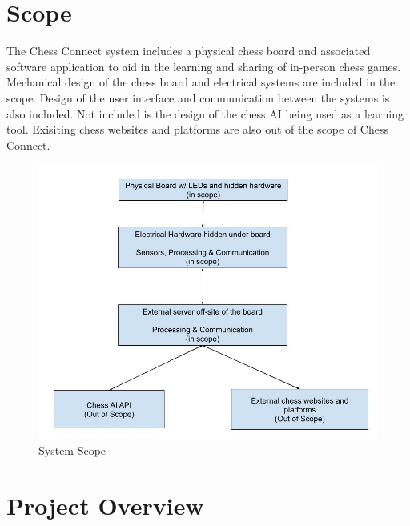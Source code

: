 \documentclass[12pt, titlepage]{article}
\begin{document}
\section{Scope}
The Chess Connect system includes a physical chess board and associated software 
application to aid in the learning and sharing of in-person chess games. 
Mechanical design of the chess board and electrical systems are included in the 
scope. Design of the user interface and communication between the systems is also
included. 
Not included is the design of the chess AI being used as a learning tool. Exisiting
chess websites and platforms are also out of the scope of Chess Connect.

\begin{figure}[H]
  \begin{center}
    \includegraphics[scale=0.45]{scope.jpg}
    \caption{System Scope}
    \label{Fig_Scope} 
  \end{center}
\end{figure}

\section{Project Overview}
\end{document}
